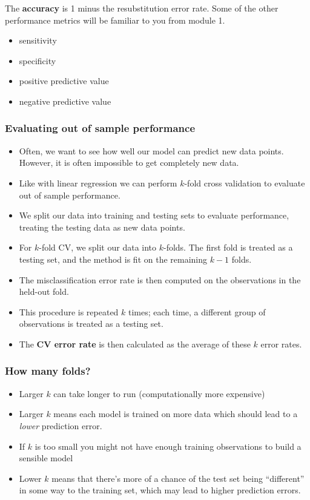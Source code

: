 \documentclass[a4paper]{article}\usepackage[]{graphicx}\usepackage[]{xcolor}
\begin{document}
The \textbf{accuracy} is 1 minus the resubstitution error rate.
Some of the other performance metrics will be familiar to you from module 1.
\begin{itemize}
	\item sensitivity
	\item specificity
	\item positive predictive value
	\item negative predictive value
\end{itemize}
\subsubsection{Evaluating out of sample performance}
\begin{itemize}
	\item Often, we want to see how well our model can predict new data points. However, it is often impossible to get completely new data.
	\item Like with linear regression we can perform \( k \)-fold cross validation to evaluate out of sample performance.
	\item We split our data into training and testing sets to evaluate performance, treating the testing data as new data points.
	\item For \( k \)-fold CV, we split our data into \( k \)-folds. The first fold is treated as a testing set, and the method is fit on the remaining \( k-1 \) folds.
	\item The misclassification error rate is then computed on the observations in the held-out fold.
	\item This procedure is repeated \( k \) times; each time, a different group of observations is treated as a testing set.
	\item The \textbf{CV error rate} is then calculated as the average of these \( k \) error rates.
\end{itemize}
\subsubsection{How many folds?}
\begin{itemize}
	\item Larger \( k \) can take longer to run (computationally more expensive)
	\item Larger \( k \) means each model is trained on more data which should lead to a \textit{lower} prediction error.
	\item If \( k \) is too small you might not have enough training observations to build a sensible model
	\item Lower \( k \) means that there's more of a chance of the test set being ``different'' in some way to the training set, which may lead to higher prediction errors.
\end{itemize}
\end{document}
